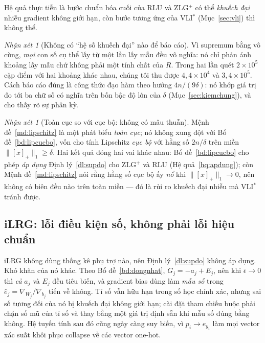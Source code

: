 \documentclass[11pt]{article}
\theoremstyle{remark}
\newtheorem{nhanxet}[dinhly]{Nhận xét}
\newcommand{\pos}[1]{\left[#1\right]_+}
\begin{document}
Hệ quả thực tiễn là bước chuẩn hóa cuối của RLU và ZLG$^+$ có thể
\emph{khuếch đại} nhiễu gradient không giới hạn, còn bước tương ứng của
VLI$^*$ (Mục~\ref{sec:vli}) thì không thể.

\begin{nhanxet}[Không có ``hệ số khuếch đại'' nào để báo cáo]
\label{nx:khongtrichso}
Vì supremum bằng vô cùng, \emph{mọi} con số cụ thể lấy từ một lần lấy mẫu đều
vô nghĩa: nó chỉ phản ánh khoảng lấy mẫu chứ không phải một tính chất của $R$.
Trong hai lần quét $2\times10^5$ cặp điểm với hai khoảng khác nhau, chúng tôi
thu được $4{,}4\times10^4$ và $3{,}4\times10^5$. Cách báo cáo đúng là công
thức đạo hàm theo hướng $4n/(9\delta)$: nó khớp giá trị đo tới ba chữ số có
nghĩa trên bốn bậc độ lớn của $\delta$ (Mục~\ref{sec:kiemchung}), và cho thấy
rõ sự phân kỳ.
\end{nhanxet}

\begin{nhanxet}[Toàn cục so với cục bộ: không có mâu thuẫn]
Mệnh đề~\ref{md:lipschitz} là một phát biểu \emph{toàn cục}; nó không xung
đột với Bổ đề~\ref{bd:lipcucbo}, vốn cho tính Lipschitz \emph{cục bộ} với
hằng số $2n/\delta$ trên miền $\|\pos{x}\|_1 \ge \delta$. Hai kết quả đóng
hai vai khác nhau: Bổ đề~\ref{bd:lipcucbo} cho phép \emph{áp dụng}
Định lý~\ref{dl:supdo} cho ZLG$^+$ và RLU (Hệ quả~\ref{hq:apdung}); còn
Mệnh đề~\ref{md:lipschitz} nói rằng hằng số cục bộ ấy \emph{nổ} khi
$\|\pos{x}\|_1 \to 0$, nên không có biên đều nào trên toàn miền --- đó là
rủi ro khuếch đại nhiễu mà VLI$^*$ tránh được.
\end{nhanxet}

\subsection{iLRG: lỗi điều kiện số, không phải lỗi hiệu chuẩn}
\label{sec:ilrg}

iLRG không dùng thống kê phụ trợ nào, nên Định lý~\ref{dl:supdo} không áp
dụng. Khó khăn của nó khác. Theo Bổ đề~\ref{bd:dongnhat},
$G_j = -a_j + E_j$, nên khi $\bar\epsilon \to 0$ thì \emph{cả} $a_j$ và $E_j$
đều tiêu biến, và gradient bias dùng làm \emph{mẫu số} trong
$\hat e_j = \nabla_{W_j}/\nabla_{b_j}$ tiến về không. Tỉ số vẫn hữu hạn trong
số học chính xác, nhưng sai số tương đối của nó bị khuếch đại không giới hạn;
cài đặt tham chiếu buộc phải chặn số mũ của tỉ số và thay bằng một giá trị
định sẵn khi mẫu số đúng bằng không. Hệ tuyến tính sau đó cũng ngày càng suy
biến, vì $p_i \to e_{y_i}$ làm mọi vector xác suất khôi phục collapse về các
vector one-hot.
\end{document}
